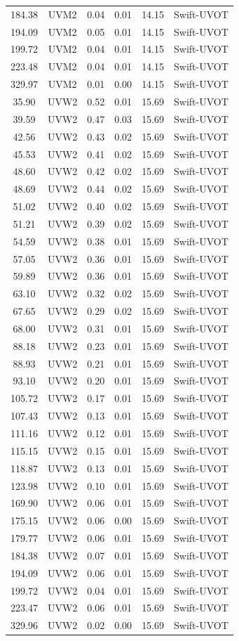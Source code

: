 \documentclass{nature_plusfigure}
\begin{document}
\begin{methods}
\begin{longtable}{|c|c|c|c|c|c|}
184.38&UVM2&0.04&0.01&14.15&Swift{-}UVOT\\%
194.09&UVM2&0.05&0.01&14.15&Swift{-}UVOT\\%
199.72&UVM2&0.04&0.01&14.15&Swift{-}UVOT\\%
223.48&UVM2&0.04&0.01&14.15&Swift{-}UVOT\\%
329.97&UVM2&0.01&0.00&14.15&Swift{-}UVOT\\%
35.90&UVW2&0.52&0.01&15.69&Swift{-}UVOT\\%
39.59&UVW2&0.47&0.03&15.69&Swift{-}UVOT\\%
42.56&UVW2&0.43&0.02&15.69&Swift{-}UVOT\\%
45.53&UVW2&0.41&0.02&15.69&Swift{-}UVOT\\%
48.60&UVW2&0.42&0.02&15.69&Swift{-}UVOT\\%
48.69&UVW2&0.44&0.02&15.69&Swift{-}UVOT\\%
51.02&UVW2&0.40&0.02&15.69&Swift{-}UVOT\\%
51.21&UVW2&0.39&0.02&15.69&Swift{-}UVOT\\%
54.59&UVW2&0.38&0.01&15.69&Swift{-}UVOT\\%
57.05&UVW2&0.36&0.01&15.69&Swift{-}UVOT\\%
59.89&UVW2&0.36&0.01&15.69&Swift{-}UVOT\\%
63.10&UVW2&0.32&0.02&15.69&Swift{-}UVOT\\%
67.65&UVW2&0.29&0.02&15.69&Swift{-}UVOT\\%
68.00&UVW2&0.31&0.01&15.69&Swift{-}UVOT\\%
88.18&UVW2&0.23&0.01&15.69&Swift{-}UVOT\\%
88.93&UVW2&0.21&0.01&15.69&Swift{-}UVOT\\%
93.10&UVW2&0.20&0.01&15.69&Swift{-}UVOT\\%
105.72&UVW2&0.17&0.01&15.69&Swift{-}UVOT\\%
107.43&UVW2&0.13&0.01&15.69&Swift{-}UVOT\\%
111.16&UVW2&0.12&0.01&15.69&Swift{-}UVOT\\%
115.15&UVW2&0.15&0.01&15.69&Swift{-}UVOT\\%
118.87&UVW2&0.13&0.01&15.69&Swift{-}UVOT\\%
123.98&UVW2&0.10&0.01&15.69&Swift{-}UVOT\\%
169.90&UVW2&0.06&0.01&15.69&Swift{-}UVOT\\%
175.15&UVW2&0.06&0.00&15.69&Swift{-}UVOT\\%
179.77&UVW2&0.06&0.01&15.69&Swift{-}UVOT\\%
184.38&UVW2&0.07&0.01&15.69&Swift{-}UVOT\\%
194.09&UVW2&0.06&0.01&15.69&Swift{-}UVOT\\%
199.72&UVW2&0.04&0.01&15.69&Swift{-}UVOT\\%
223.47&UVW2&0.06&0.01&15.69&Swift{-}UVOT\\%
329.96&UVW2&0.02&0.00&15.69&Swift{-}UVOT\\%
\end{longtable}


\end{methods}
\end{document}
